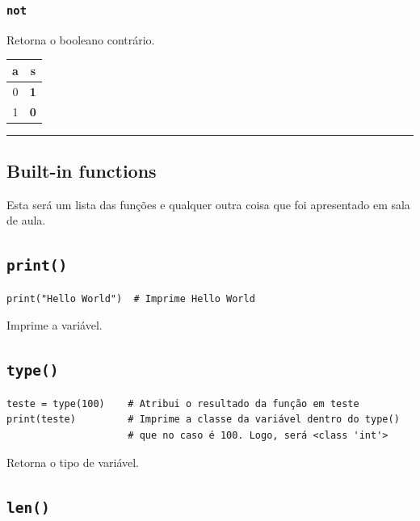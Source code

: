 \documentclass[]{book}
\begin{document}
\subsubsection{\texorpdfstring{\texttt{not}}{not}}\label{not}

Retorna o booleano contrário.

\begin{longtable}[]{@{}cc@{}}
\toprule
a & \textbf{s}\tabularnewline
\midrule
\endhead
0 & \textbf{1}\tabularnewline
1 & \textbf{0}\tabularnewline
\bottomrule
\end{longtable}

\begin{center}\rule{0.5\linewidth}{\linethickness}\end{center}

\subsection{Built-in functions}\label{built-in-functions}

Esta será um lista das funções e qualquer outra coisa que foi
apresentado em sala de aula.

\subsection{\texorpdfstring{\texttt{print()}}{print()}}\label{print}

\begin{verbatim}
print("Hello World")  # Imprime Hello World
\end{verbatim}

Imprime a variável.

\subsection{\texorpdfstring{\texttt{type()}}{type()}}\label{type}

\begin{verbatim}
teste = type(100)    # Atribui o resultado da função em teste
print(teste)         # Imprime a classe da variável dentro do type()
                     # que no caso é 100. Logo, será <class 'int'>
\end{verbatim}

Retorna o tipo de variável.

\subsection{\texorpdfstring{\texttt{len()}}{len()}}\label{len}
\end{document}
